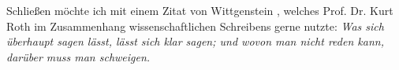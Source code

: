 %


Schließen möchte ich mit einem Zitat von Wittgenstein \cite{Wittgenstein1922},
welches Prof. Dr. Kurt Roth im Zusammenhang wissenschaftlichen
Schreibens gerne nutzte: {\it Was sich überhaupt sagen lässt, lässt
sich klar sagen; und wovon man nicht reden kann, darüber muss man
schweigen.} 
